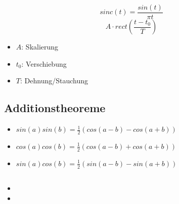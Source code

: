 \documentclass{article}
\begin{document}
$$sinc(t) = \frac{sin(t)}{\pi t}$$
$$A\cdot rect(\frac{t-t_0}{T})$$
\begin{itemize}
\item $A$: Skalierung
\item $t_0$: Verschiebung
\item $T$: Dehnung/Stauchung
\end{itemize}











\subsection{Additionstheoreme}
\begin{itemize}
\item $sin(a)sin(b)=\frac{1}{2} (cos(a-b)-cos(a+b))$
\item $cos(a)cos(b)=\frac{1}{2} (cos(a-b)+cos(a+b))$
\item $sin(a)cos(b)=\frac{1}{2} (sin(a-b)-sin(a+b))$
\end{itemize}


\subsection{}
\begin{itemize}
\item
\item
\end{itemize}
\end{document}
